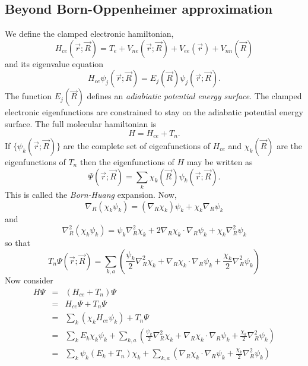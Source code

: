 \subsection{Beyond Born-Oppenheimer approximation}
We define the clamped electronic hamiltonian,
\begin{equation}\label{c2e23}
H_{ce}(\vec{r}; \vec{R}) = T_e + V_{ne}(\vec{r}; \vec{R}) + V_{ee}(\vec{r})
+ V_{nn}(\vec{R})
\end{equation}
and its eigenvalue equation
\begin{equation}\label{c2e24}
H_{ce}\psi_j(\vec{r}; \vec{R}) = E_j(\vec{R})\psi_j(\vec{r}; \vec{R}).
\end{equation}
The function $E_j(\vec{R})$ defines an \emph{adiabiatic potential 
energy surface}. The clamped electronic eigenfunctions are constrained to
stay on the adiabatic potential energy surface. The full molecular hamiltonian
is
\begin{equation}\label{c2e25}
H = H_{ce} + T_n.
\end{equation}
If $\{\psi_k(\vec{r}; \vec{R})\}$ are the complete set of eigenfunctions of
$H_{ce}$ and $\chi_k(\vec{R})$ are the eigenfunctions of $T_n$ then the
eigenfunctions of $H$ may be written as
\begin{equation}\label{c2e26}
\Psi(\vec{r}; \vec{R}) = \sum_k\chi_k(\vec{R})\psi_k(\vec{r}; \vec{R}).
\end{equation}
This is called the \emph{Born-Huang} expansion. Now,
\[
\nabla_R(\chi_k\psi_k) = (\nabla_R\chi_k)\psi_k + \chi_k\nabla_R\psi_k
\]
and
\[
\nabla^2_R(\chi_k\psi_k) = \psi_k\nabla^2_R\chi_k + 2\nabla_R\chi_k\cdot\nabla_R
\psi_k + \chi_k\nabla_R^2\psi_k
\]
so that 
\begin{equation}\label{c2e27}
T_n\Psi(\vec{r}; \vec{R}) = \sum_{k,a}\left(\frac{\psi_k}{2}\nabla^2_R\chi_k +
\nabla_R\chi_k\cdot\nabla_R\psi_k + \frac{\chi_k}{2}\nabla_R^2\psi_k\right)
\end{equation}
Now consider
\begin{eqnarray*}
H\Psi &=& (H_{ce} + T_n)\Psi \\
 &=& H_{ce}\Psi + T_n\Psi \\
 &=& \sum_k(\chi_k H_{ce}\psi_k) + T_n\Psi \\
 &=& \sum_kE_k\chi_k\psi_k + \sum_{k,a}\left(\frac{\psi_k}{2}\nabla^2_R\chi_k + 
 \nabla_R\chi_k\cdot\nabla_R\psi_k + \frac{\chi_k}{2}\nabla_R^2\psi_k\right) \\
 &=& \sum_k\psi_k(E_k + T_n)\chi_k + \sum_{k,a}\left( 
 \nabla_R\chi_k\cdot\nabla_R\psi_k + \frac{\chi_k}{2}\nabla_R^2\psi_k\right) 
\end{eqnarray*}
